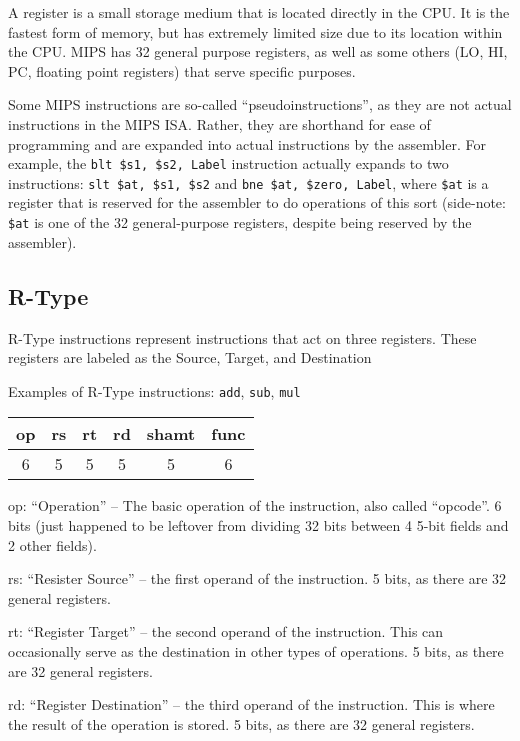 \documentclass{article}
\begin{document}
A register is a small storage medium that is located directly in the CPU. It is the fastest form of memory, but has extremely limited size due to its location within the CPU. MIPS has 32 general purpose registers, as well as some others (LO, HI, PC, floating point registers) that serve specific purposes. 

Some MIPS instructions are so-called ``pseudoinstructions'', as they are not actual instructions in the MIPS ISA. Rather, they are shorthand for ease of programming and are expanded into actual instructions by the assembler. For example, the \texttt{blt \$s1, \$s2, Label} instruction actually expands to two instructions: \texttt{slt \$at, \$s1, \$s2} and \texttt{bne \$at, \$zero, Label}, where \texttt{\$at} is a register that is reserved for the assembler to do operations of this sort (side-note: \texttt{\$at} is one of the 32 general-purpose registers, despite being reserved by the assembler). 


\subsection{R-Type}\label{RType}
R-Type instructions represent instructions that act on three registers. These registers are labeled as the Source, Target, and Destination

Examples of R-Type instructions: \texttt{add}, \texttt{sub}, \texttt{mul}

\begin{tabular}{|c|c|c|c|c|c|}
    \hline
    op & rs & rt & rd & shamt & func \\
    \hline
    6 & 5 & 5 & 5 & 5 & 6 \\ 
    \hline
\end{tabular}

op: ``Operation'' -- The basic operation of the instruction, also called ``opcode''. 6 bits (just happened to be leftover from dividing 32 bits between 4 5-bit fields and 2 other fields).

rs: ``Resister Source'' -- the first operand of the instruction. 5 bits, as there are 32 general registers. 

rt: ``Register Target'' -- the second operand of the instruction. This can occasionally serve as the destination in other types of operations. 5 bits, as there are 32 general registers. 

rd: ``Register Destination'' -- the third operand of the instruction. This is where the result of the operation is stored. 5 bits, as there are 32 general registers. 
\end{document}
